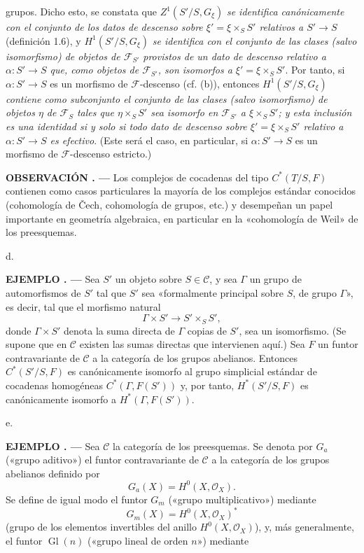 \documentclass[11pt,twoside,openany]{book}
\numberwithin{equation}{section}
\newcommand{\src}[1]{%
  \phantomsection\hypertarget{src:#1}{}%
  \marginpar{\raggedleft\footnotesize\sffamily #1}%
}
\theoremstyle{plain}
\theoremstyle{definition}
\theoremstyle{remark}
\newcommand{\result}[2]{%
  \par\medskip\noindent\textbf{#1%
  \if\relax\detokenize{#2}\relax\else\space#2\fi. ---}\enspace
}
\newcommand{\FgaUnitKey}{frontmatter}
\renewcommand{\src}[1]{%
  \phantomsection\hypertarget{src:\FgaUnitKey:#1}{}%
  \marginpar{\raggedleft\footnotesize\sffamily #1}%
}
\theoremstyle{plain}
\theoremstyle{definition}
\theoremstyle{remark}
\begin{document}
\src{312}
grupos. Dicho esto, se constata que $Z^1(S'/S,G_\xi)$ \emph{se identifica
canónicamente con el conjunto de los datos de descenso sobre
$\xi'=\xi\times_SS'$ relativos a $S'\longrightarrow S$} (definición 1.6), y
$H^1(S'/S,G_\xi)$ \emph{se identifica con el conjunto de las clases (salvo
isomorfismo) de objetos de $\mathcal F_{S'}$ provistos de un dato de descenso
relativo a $\alpha:S'\longrightarrow S$ que, como objetos de
$\mathcal F_{S'}$, son isomorfos a $\xi'=\xi\times_SS'$}. Por tanto, si
$\alpha:S'\longrightarrow S$ es un morfismo de $\mathcal F$-descenso
(cf. (b)), entonces $H^1(S'/S,G_\xi)$ \emph{contiene como subconjunto el
conjunto de las clases (salvo isomorfismo) de objetos $\eta$ de
$\mathcal F_S$ tales que $\eta\times_SS'$ sea isomorfo en
$\mathcal F_{S'}$ a $\xi\times_SS'$; y esta inclusión es una identidad si y
solo si todo dato de descenso sobre $\xi'=\xi\times_SS'$ relativo a
$\alpha:S'\longrightarrow S$ es efectivo}. (Este será el caso, en particular,
si $\alpha:S'\longrightarrow S$ es un morfismo de $\mathcal F$-descenso
estricto.)

\result{OBSERVACIÓN}{} Los complejos de cocadenas del tipo $C^*(T/S,F)$
contienen como casos particulares la mayoría de los complejos estándar
conocidos (cohomología de Čech, cohomología de grupos, etc.) y desempeñan un
papel importante en geometría algebraica, en particular en la «cohomología de
Weil» de los preesquemas.

\medskip\noindent
d. \result{EJEMPLO}{1} Sea $S'$ un objeto sobre $S\in\mathcal C$, y sea
$\Gamma$ un grupo de automorfismos de $S'$ tal que $S'$ sea «formalmente
principal sobre $S$, de grupo $\Gamma$», es decir, tal que el morfismo natural
\[
  \Gamma\times S'\longrightarrow S'\times_SS',
\]
donde $\Gamma\times S'$ denota la suma directa de $\Gamma$ copias de $S'$, sea
un isomorfismo. (Se supone que en $\mathcal C$ existen las sumas directas que
intervienen aquí.) Sea $F$ un funtor contravariante de $\mathcal C$ a la
categoría de los grupos abelianos. Entonces $C^*(S'/S,F)$ es canónicamente
isomorfo al grupo simplicial estándar de cocadenas homogéneas
$C^*(\Gamma,F(S'))$ y, por tanto, $H^*(S'/S,F)$ es canónicamente isomorfo a
$H^*(\Gamma,F(S'))$.

\medskip\noindent
e. \result{EJEMPLO}{2} Sea $\mathcal C$ la categoría de los preesquemas. Se
denota por $G_a$ («grupo aditivo») el funtor contravariante de $\mathcal C$ a
la categoría de los grupos abelianos definido por
\[
  G_a(X)=H^0(X,\mathcal O_X).
\]
Se define de igual modo el funtor $G_m$ («grupo multiplicativo») mediante
\[
  G_m(X)=H^0(X,\mathcal O_X)^*
\]
(grupo de los elementos invertibles del anillo $H^0(X,\mathcal O_X)$), y, más
generalmente, el funtor $\operatorname{Gl}(n)$ («grupo lineal de orden $n$»)
mediante
\end{document}

